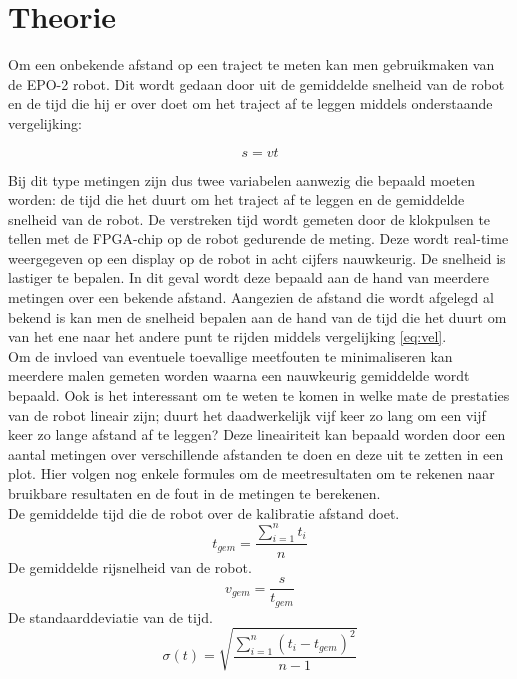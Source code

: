 \documentclass{report}
\begin{document}
\chapter{Theorie}
Om een onbekende afstand op een traject te meten kan men gebruikmaken van de EPO-2 robot. Dit wordt gedaan door uit de gemiddelde snelheid van de robot en de tijd 
die hij er over doet om het traject af te leggen middels onderstaande vergelijking:

\begin{equation}
\label{eq:vel}
s = vt
\end{equation}

Bij dit type metingen zijn dus twee variabelen aanwezig die bepaald moeten worden: de tijd die het duurt om het traject af te leggen en de gemiddelde snelheid van de robot. 
De verstreken tijd wordt gemeten door de klokpulsen te tellen met de FPGA-chip op de robot gedurende de meting. Deze wordt real-time weergegeven op een display op de robot in acht cijfers nauwkeurig.
De snelheid is lastiger te bepalen. In dit geval wordt deze bepaald aan de hand van meerdere metingen over een bekende afstand. Aangezien de afstand die wordt afgelegd al bekend is kan men de snelheid bepalen aan de hand van de tijd die het duurt om van het ene naar het andere punt te rijden middels vergelijking \ref{eq:vel}.\\
Om de invloed van eventuele toevallige meetfouten te minimaliseren kan meerdere malen gemeten worden waarna een nauwkeurig gemiddelde wordt bepaald. Ook is het interessant om te weten te komen in welke mate de prestaties van de robot lineair zijn; duurt het daadwerkelijk vijf keer zo lang om een vijf keer zo lange afstand af te leggen? Deze lineairiteit kan bepaald worden door een aantal metingen over verschillende afstanden te doen en deze uit te zetten in een plot.
Hier volgen nog enkele formules om de meetresultaten om te rekenen naar bruikbare resultaten en de fout in de metingen te berekenen.\\
\small{De gemiddelde tijd die de robot over de kalibratie afstand doet.}
\begin{equation}
\label{eq:avgTime}
t_{gem}=\frac{\sum_{i=1}^{n}t_i}{n}
\end{equation}
\small{De gemiddelde rijsnelheid van de robot.}
\begin{equation}
\label{eq:avgVel}
v_{gem} = \frac{s}{t_{gem}}
\end{equation}
\small{De standaarddeviatie van de tijd. \cite{epo1-onzekerheden}}
\begin{equation}
\label{eq:standaardDev}
\sigma(t) = \sqrt{\frac{\sum_{i=1}^{n}( t_i-t_{gem})^2}{n-1}}
\end{equation}
\end{document}
